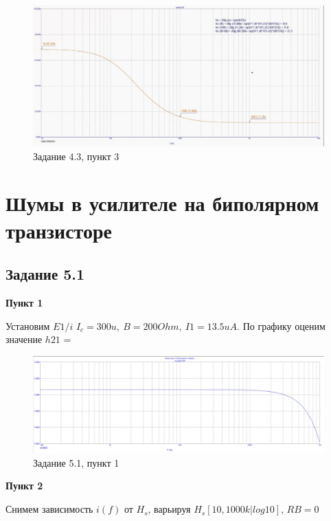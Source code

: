 \documentclass[a4paper, 14pt]{extarticle}%
\begin{document}
\begin{figure}[h!]
			\centering
			\includegraphics[width=1.1\linewidth]{4/4_3_1.jpg}
			\caption{Задание 4.3, пункт 3}
			\label{A}
\end{figure}


\newpage

\section{Шумы в усилителе на биполярном транзисторе}

\subsection{Задание 5.1}
\textbf{Пункт 1}
\newline

Установим ${E1/i}$
\newline
$I_c = 300u, \:B = 200Ohm, \: I1 = 13.5uA.$ 
\newline
По графику оценим значение $h21$ = 

\begin{figure}[h!]
			\centering
			\includegraphics[width=1.1\linewidth]{5/5_1_1.jpg}
			\caption{Задание 5.1, пункт 1}
			\label{A}
\end{figure}

\textbf{Пункт 2}
\newline

Снимем зависимость $i(f)$ от $H_s$, варьируя $H_s[10, 1000k|log10]$, $RB = 0$
\end{document}
